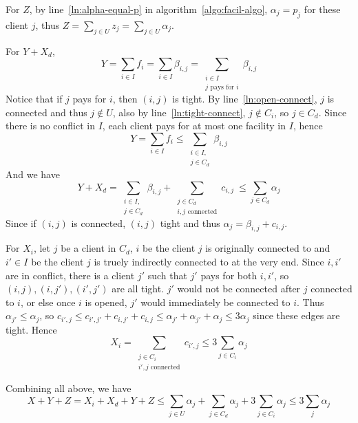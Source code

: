 \documentclass[12pt, a4paper]{article}
\begin{document}
For $Z$, by line~\ref{ln:alpha-equal-p} in algorithm~\ref{algo:facil-algo}, $\alpha_j = p_j$
for these client $j$, thus $Z = \sum_{j \in U} z_j = \sum_{j \in U} \alpha_j$.

For $Y+X_d$,
\[ Y = \sum_{i \in I} f_i = \sum_{i \in I} \beta_{i, j} = \sum_{\substack{i \in I \\ j \text{ pays for } i}} \beta_{i, j} \]
Notice that if $j$ pays for $i$, then $(i, j)$ is tight. By line~\ref{ln:open-connect}, $j$ is connected
and thus $j \not\in U$, also by line~\ref{ln:tight-connect}, $j \not\in C_i$, so
$j \in C_d$. Since there is no conflict in $I$, each client {pays} for at most one
facility in $I$, hence
\[ Y = \sum_{i \in I} f_i \leq \sum_{\substack{i \in I, \\ j \in C_d}} \beta_{i, j} \]
And we have
\[ Y + X_d = \sum_{\substack{i \in I, \\ j \in C_d}} \beta_{i, j}
  + \sum_{\substack{j \in C_d \\ i, j \text{ connected}}} c_{i, j} \ \leq \sum_{j \in C_d} \alpha_j \]
Since if $(i, j)$ is connected, $(i, j)$ tight and thus $\alpha_j = \beta_{i, j} + c_{i, j}$.

For $X_i$, let $j$ be a client in $C_d$, $i$ be the client $j$ is originally connected to and
$i' \in I$ be the client $j$ is truely indirectly connected to at the very end.
Since $i, i'$ are in conflict, there is a client $j'$ such that $j'$ pays for both $i, i'$,
so $(i, j), (i, j'), (i', j')$ are all tight.
$j'$ would not be connected after $j$ connected to $i$, or else once $i$ is opened,
$j'$ would immediately be connected to $i$. Thus $\alpha_{j'} \leq \alpha_j$,
so $c_{i', j} \leq c_{i', j'} + c_{i, j'} + c_{i, j} \leq \alpha_{j'} + \alpha_{j'} + \alpha_j
\leq 3 \alpha_j$ since these edges are tight. Hence
\[ X_i = \sum_{\substack{j \in C_i \\ i', j \text{ connected}}} c_{i', j}
  \leq 3 \sum_{j \in C_i} \alpha_j \]

Combining all above, we have
\[ X + Y + Z = X_i + X_d + Y + Z \leq \sum_{j \in U} \alpha_j + \sum_{j \in C_d} \alpha_j
  + 3 \sum_{j \in C_i} \alpha_j \leq 3 \sum_{j} \alpha_j \]
\end{document}

